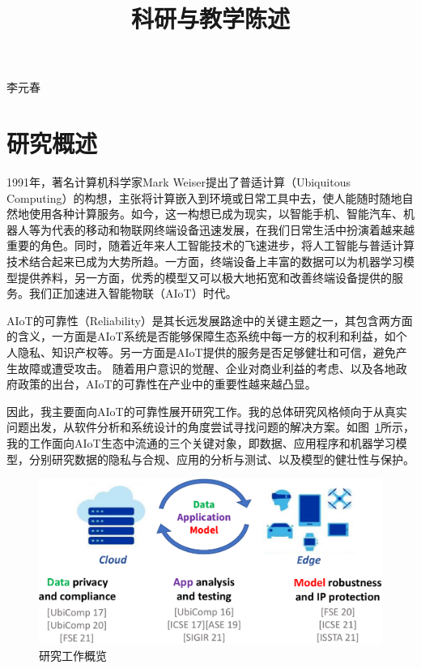 \documentclass[12pt]{article}
\begin{document}

\title{科研与教学陈述}

\maketitle


\begin{center} {李元春} \end{center}


\section{研究概述}

1991年，著名计算机科学家Mark Weiser提出了普适计算（Ubiquitous Computing）的构想，主张将计算嵌入到环境或日常工具中去，使人能随时随地自然地使用各种计算服务。如今，这一构想已成为现实，以智能手机、智能汽车、机器人等为代表的移动和物联网终端设备迅速发展，在我们日常生活中扮演着越来越重要的角色。同时，随着近年来人工智能技术的飞速进步，将人工智能与普适计算技术结合起来已成为大势所趋。一方面，终端设备上丰富的数据可以为机器学习模型提供养料，另一方面，优秀的模型又可以极大地拓宽和改善终端设备提供的服务。我们正加速进入智能物联（AIoT）时代。

AIoT的可靠性（Reliability）是其长远发展路途中的关键主题之一，其包含两方面的含义，一方面是AIoT系统是否能够保障生态系统中每一方的权利和利益，如个人隐私、知识产权等。另一方面是AIoT提供的服务是否足够健壮和可信，避免产生故障或遭受攻击。
随着用户意识的觉醒、企业对商业利益的考虑、以及各地政府政策的出台，AIoT的可靠性在产业中的重要性越来越凸显。

因此，我主要面向AIoT的可靠性展开研究工作。我的总体研究风格倾向于从真实问题出发，从软件分析和系统设计的角度尝试寻找问题的解决方案。如图~\ref{fig:overview}所示，我的工作面向AIoT生态中流通的三个关键对象，即数据、应用程序和机器学习模型，分别研究数据的隐私与合规、应用的分析与测试、以及模型的健壮性与保护。


\begin{figure}
    \centering
    \includegraphics[width=5in]{figures/research_overview.pdf}
    \caption{研究工作概览}
    \label{fig:overview}
\end{figure}
\end{document}
